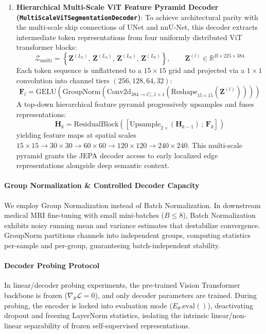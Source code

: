 \documentclass{article}
\begin{document}
\begin{enumerate}
    \item \textbf{Hierarchical Multi-Scale ViT Feature Pyramid Decoder (\texttt{Multi\-Scale\-ViT\-Segmentation\-Decoder})}: To achieve architectural parity with the multi-scale skip connections of UNet and nnU-Net, this decoder extracts intermediate token representations from four uniformly distributed ViT transformer blocks:
    \begin{equation}
        \mathcal{Z}_{\text{multi}} = \left\{ \mathbf{Z}^{(L_2)}, \, \mathbf{Z}^{(L_4)}, \, \mathbf{Z}^{(L_6)}, \, \mathbf{Z}^{(L_8)} \right\}, \qquad \mathbf{Z}^{(l)} \in \mathbb{R}^{B \times 225 \times 384}
    \end{equation}
    Each token sequence is unflattened to a $15 \times 15$ grid and projected via a $1 \times 1$ convolution into channel tiers $(256, 128, 64, 32)$:
    \begin{equation}
        \mathbf{F}_l = \text{GELU}\left(\text{GroupNorm}\left(\text{Conv2d}_{384 \to C_l, 1\times 1}\left(\text{Reshape}_{15 \times 15}(\mathbf{Z}^{(l)})\right)\right)\right)
    \end{equation}
    A top-down hierarchical feature pyramid progressively upsamples and fuses representations:
    \begin{equation}
        \mathbf{H}_k = \text{ResidualBlock}\left(\left[ \text{Upsample}_{2\times}(\mathbf{H}_{k-1}) \,;\, \mathbf{F}_{k} \right]\right)
    \end{equation}
    yielding feature maps at spatial scales $15 \times 15 \to 30 \times 30 \to 60 \times 60 \to 120 \times 120 \to 240 \times 240$. This multi-scale pyramid grants the JEPA decoder access to early localized edge representations alongside deep semantic context.
\end{enumerate}

\paragraph{Group Normalization \& Controlled Decoder Capacity}
We employ Group Normalization \citep{wu2018group} instead of Batch Normalization. In downstream medical MRI fine-tuning with small mini-batches ($B \le 8$), Batch Normalization exhibits noisy running mean and variance estimates that destabilize convergence. GroupNorm partitions channels into independent groups, computing statistics per-sample and per-group, guaranteeing batch-independent stability.

\paragraph{Decoder Probing Protocol}
In linear/decoder probing experiments, the pre-trained Vision Transformer backbone is frozen ($\nabla_\theta \mathcal{L} = 0$), and only decoder parameters are trained. During probing, the encoder is locked into evaluation mode ($E_\theta.\text{eval}()$), deactivating dropout and freezing LayerNorm statistics, isolating the intrinsic linear/non-linear separability of frozen self-supervised representations.
\end{document}
